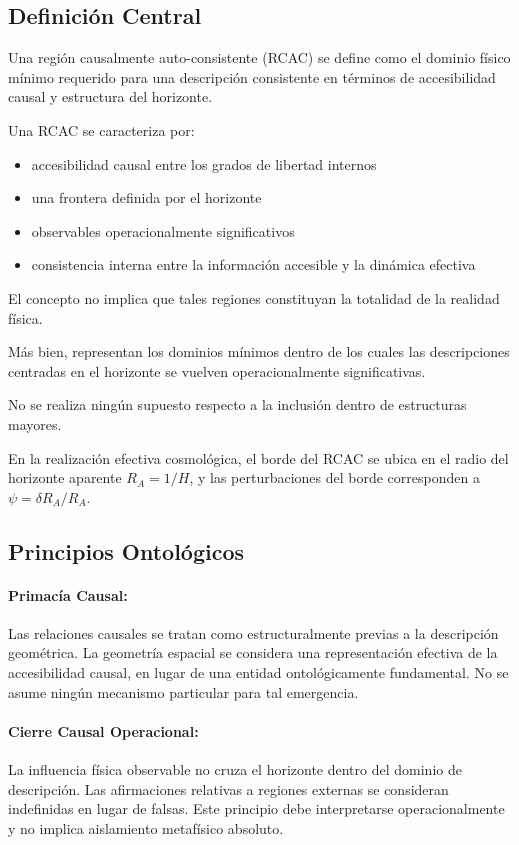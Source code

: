 \documentclass[12pt,a4paper]{article}
\begin{document}
\subsection{Definición Central}

Una región causalmente auto-consistente (RCAC) se define como el dominio físico mínimo requerido para una descripción consistente en términos de accesibilidad causal y estructura del horizonte.

Una RCAC se caracteriza por:

\begin{itemize}
  \item accesibilidad causal entre los grados de libertad internos
  \item una frontera definida por el horizonte
  \item observables operacionalmente significativos
  \item consistencia interna entre la información accesible y la dinámica efectiva
\end{itemize}

El concepto no implica que tales regiones constituyan la totalidad de la realidad física.

Más bien, representan los dominios mínimos dentro de los cuales las descripciones centradas en el horizonte se vuelven operacionalmente significativas.

No se realiza ningún supuesto respecto a la inclusión dentro de estructuras mayores.

En la realización efectiva cosmológica, el borde del RCAC se ubica en el radio del horizonte aparente $R_A = 1/H$, y las perturbaciones del borde corresponden a $\psi = \delta R_A / R_A$.

\subsection{Principios Ontológicos}

\paragraph{Primacía Causal:} Las relaciones causales se tratan como estructuralmente previas a la descripción geométrica. La geometría espacial se considera una representación efectiva de la accesibilidad causal, en lugar de una entidad ontológicamente fundamental. No se asume ningún mecanismo particular para tal emergencia.

\paragraph{Cierre Causal Operacional:} La influencia física observable no cruza el horizonte dentro del dominio de descripción. Las afirmaciones relativas a regiones externas se consideran indefinidas en lugar de falsas. Este principio debe interpretarse operacionalmente y no implica aislamiento metafísico absoluto.
\end{document}
